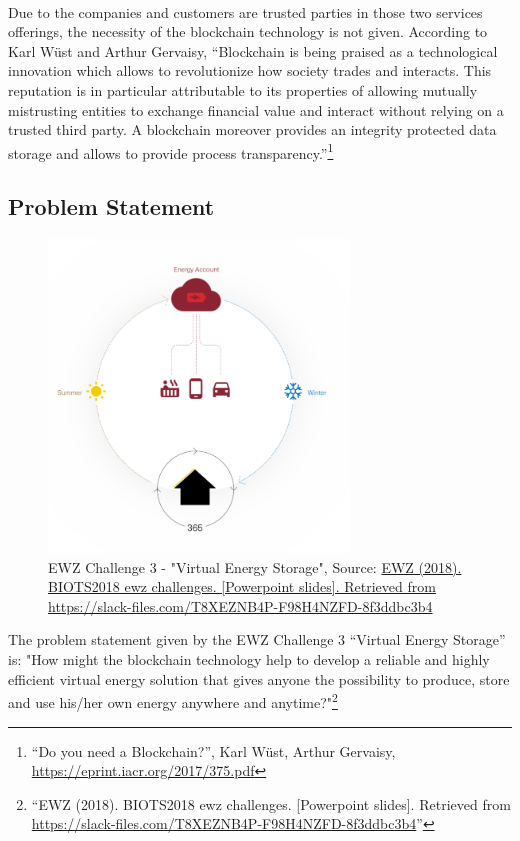 \documentclass{scrartcl}
\begin{document}
	\paragraph{}
	Due to the companies and customers are trusted parties in those two services offerings, the necessity of the blockchain technology is not given. According to Karl Wüst and Arthur Gervaisy, “Blockchain is being praised as a technological innovation which allows to revolutionize how society trades and interacts. This reputation is in particular attributable to its properties of allowing mutually mistrusting entities to exchange financial value and interact without relying on a trusted third party. A blockchain moreover provides an integrity protected data storage and allows to provide process transparency.”\footnote{“Do you need a Blockchain?”, Karl Wüst, Arthur Gervaisy, \url{https://eprint.iacr.org/2017/375.pdf}}
	
	\subsection{Problem Statement}
	
	\begin{figure} [h!]
		\centering
		\includegraphics[width=80mm,scale=0.5]{01_introduction_picture02.PNG}
		\caption{EWZ Challenge 3 - "Virtual Energy Storage", Source: \url{EWZ (2018). BIOTS2018 ewz challenges. [Powerpoint slides]. Retrieved from https://slack-files.com/T8XEZNB4P-F98H4NZFD-8f3ddbc3b4}}
	\end{figure}
	
	The problem statement given by the EWZ Challenge 3 “Virtual Energy Storage” is: "How might the blockchain technology help to develop a reliable and highly efficient virtual energy solution that gives anyone the possibility to produce, store and use his/her own energy anywhere and anytime?"\footnote{“EWZ (2018). BIOTS2018 ewz challenges. [Powerpoint slides]. Retrieved from \url{https://slack-files.com/T8XEZNB4P-F98H4NZFD-8f3ddbc3b4}”}
	
\end{document}

